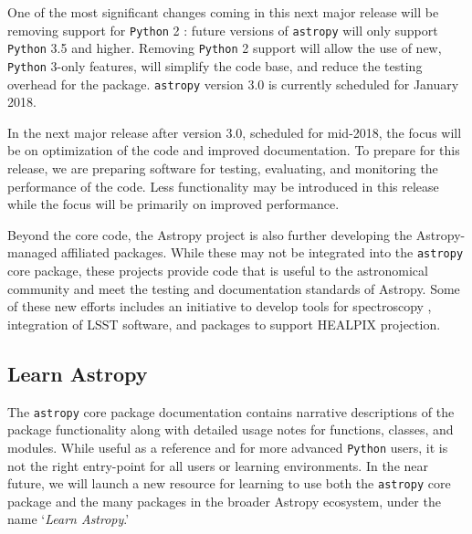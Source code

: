 \documentclass[modern]{aastex61}
\newcommand{\package}[1]{\texttt{#1}\xspace}
\newcommand{\python}{\package{Python}}
\newcommand{\astropy}{Astropy\xspace}
\newcommand{\astropypkg}{\package{astropy}}
\newcommand{\inlinecomment}[2]{\todo[inline]{#1: #2}\xspace}
\begin{document}
One of the most significant changes coming in this next major release will be
removing support for \python 2 \citep{ape10}: future versions of \astropypkg
will only support \python 3.5 and higher.
Removing \python 2 support will allow the use of new, \python 3-only features,
will simplify the code base, and reduce the testing overhead for the package.
\astropypkg version 3.0 is currently scheduled for January 2018.

In the next major release after version 3.0, scheduled for
mid-2018, the focus will be on optimization of the code and improved
documentation.
To prepare for this release, we are preparing software for testing, evaluating,
and monitoring the performance of the code.
Less functionality may be introduced in this release while the focus will be
primarily on improved performance.

Beyond the core code, the \astropy project is also further developing the
\astropy-managed affiliated packages.
While these may not be integrated into the \astropypkg core package, these
projects provide code that is useful to the astronomical community and meet the
testing and documentation standards of \astropy.
Some of these new efforts includes an initiative to develop tools for
spectroscopy \citep[\package{specutils}, \package{specreduc}, \package{specviz}]
{ape13}, integration of LSST software, and packages to support HEALPIX
projection. %

\subsection{Learn Astropy}

The \astropypkg core package documentation contains narrative descriptions of
the package functionality along with detailed usage notes for functions,
classes, and modules.
While useful as a reference and for more advanced \python users, it is not the
right entry-point for all users or learning environments.
In the near future, we will launch a new resource for learning to use both the
\astropypkg core package and the many packages in the broader \astropy
ecosystem, under the name `\emph{Learn Astropy}.'
\end{document}
